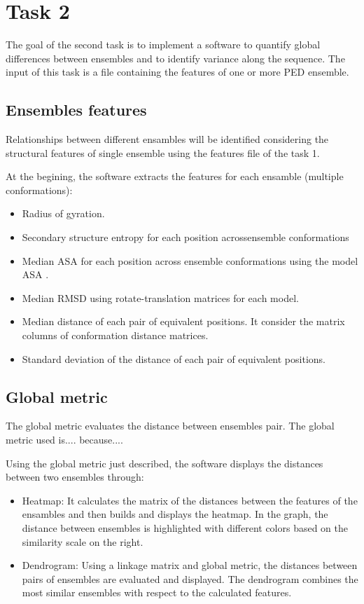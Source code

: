 \section{Task 2}\label{sec:task2}

The goal of the second task is to implement a software to quantify global differences between ensembles and to identify variance along the sequence. The input of this task is a file containing the features of one or more PED ensemble.

\subsection{Ensembles features}
Relationships between different ensambles will be identified considering the structural features of single ensemble using the features file of the task 1.

At the begining, the software extracts the features for each ensamble (multiple conformations):
\begin{itemize}
\item Radius of gyration.
\item Secondary structure entropy for each position acrossensemble conformations
\item Median ASA for each position across ensemble conformations using the model ASA .
\item Median RMSD using rotate-translation matrices for each model.
\item Median distance of each pair of equivalent positions. It consider the matrix columns of conformation distance matrices.
\item Standard deviation of the distance of each pair of equivalent positions.
\end{itemize}


\subsection{Global metric}
The global metric evaluates the distance between ensembles pair. 
The global metric used is.... because....

Using the global metric just described, the software displays the distances between two ensembles through:
\begin{itemize}
\item Heatmap: It calculates the matrix of the distances between the features of the ensambles and then builds and displays the heatmap. In the graph, the distance between ensembles is highlighted with different colors based on the similarity scale on the right. 
\item Dendrogram: Using a linkage matrix and global metric, the distances between pairs of ensembles are evaluated and displayed. The dendrogram combines the most similar ensembles with respect to the calculated features.
\end{itemize}

